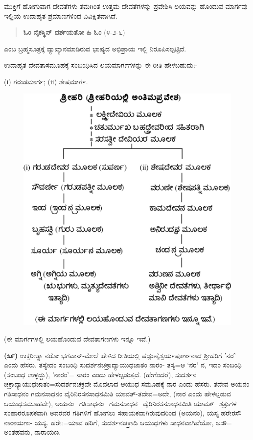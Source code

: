 ಮುಕ್ತಿಗೆ ಹೋಗುವಾಗ ದೇವತೆಗಳು ತಮಗಿಂತ ಉತ್ತಮ ದೇವತೆಗಳನ್ನು ಪ್ರವೇಶಿಸಿ ಲಯವನ್ನು ಹೊಂದುವ ಮಾರ್ಗವು ಇಲ್ಲಿಯ ಉದಾಹೃತ ಪ್ರಮಾಣಗಳಿಂದ ವಿವಿಕ್ಷಿತವಾಗಿದೆ.

\begin{verse}
\textbf{ಓಂ ನೈಕಸ್ಥಿನ್ ದರ್ಶಯತೋ ಹಿ ಓಂ} (೪-೨-೬)
\end{verse}

\noindent
ಎಂಬ ಬ್ರಹ್ಮಸೂತ್ರಕ್ಕೆ ವ್ಯಾಖ್ಯಾನಮಾಡಿರುವ ಭಾಷ್ಯದ ಅಭಿಪ್ರಾಯ ಇಲ್ಲಿ ನಿರೂಪಿಸಲ್ಪಟ್ಟಿದೆ.

ಉದಾಹೃತ ದೇವತಾಸಮೂಹಕ್ಕೆ ಸಂಬಂಧಿಸಿದ ಲಯಮಾರ್ಗಗಳನ್ನು ಈ ರೀತಿ ಹೇಳಬಹುದು:-

(i) ಗರುಡಮಾರ್ಗ; (ii) ಶೇಷಮಾರ್ಗ.

\begin{figure}[!htbp]
\includegraphics[scale=.85]{images/fig2.jpg}
\end{figure}

(ಈ ಮಾರ್ಗಗಳಲ್ಲಿ ಲಯಹೊಂದುವ ದೇವತಾಗಣಗಳು ಇನ್ನೂ ಇವೆ.)

\textbf{(೩೯)} ಉಕ್ತರೀತ್ಯಾ ನರೋ ಭಗವಾನ್-ಮೇಲೆ ಹೇಳಿದ ರೀತಿಯಲ್ಲಿ ಷಡ್ಗುಣೈಶ್ವರ್ಯಪೂರ್ಣನಾದ ಶ‍್ರೀಹರಿಗೆ 'ನರ' ಎಂದು ಹೆಸರು. ತಸ್ಯೇದಂ ಸಂಬಂಧಿ ಸುದರ್ಶನಚಕ್ರಾದ್ಯಾಯುಧಜಾತಂ ನಾರಂ- ತಸ್ಯ=ಆ `ನರ' ನ, ಇದಂ ಸಂಬಂಧಿ (ಸಂಬಂಧ ಉಳ್ಳದ್ದು), 'ನಾರಂ'= ನಾರಂ ಎಂದು ಹೇಳಲ್ಪಡುತ್ತದೆ. (ಹೇಗೆಂದರೆ), ಸುದರ್ಶನ ಚಕ್ರಾದ್ಯಾಯುಧ\-ಜಾತಂ=ಸುದರ್ಶನಚಕ್ರವೇ ಮೊದಲಾದ ಆಯುಧ ಸಮೂಹಕ್ಕೆ ನಾರ ಎಂದು ಹೆಸರು. ತದೇವ ಅಯನಂ ಗತಿಸಾಧನಂ ಗಮನಸಾಧನಂ ವೈರಿನಿರಸನಸಾಧನಮಿತಿ ಯಾವತ್-ತದೇವ=ಅದೇ, (ನಾರ ಎಂದು ಹೇಳಲ್ಪಡುವ ಆಯುಧಸಮೂಹವೇ), ಅಯನಂ=ಗತಿಸಾಧನಂ=ಗಮನ\-ಸಾಧನ=ವೈರಿನಿರಸನಸಾಧನಮಿತಿ ಯಾವತ್=ಶತ್ರುಗಳ ಸಂಹಾರರೂಪಕವಾಗಿ ಅವರವರ ಗತಿಗಳಿಗೆ ಹೋಗಲು ಸಹಾಯಕವಾಗಿರುವುದರಿಂದ (ಅಯನಂ), ಯಸ್ಯ ಹರೇರಸೌ‌ ನಾರಾಯಣಃ\-- ಯಸ್ಯ. ಹರೇಃ=ಯಾವ ಹರಿಗೆ, ಸುದರ್ಶನಚಕ್ರಾದಿ ಆಯುಧಗಳು ಸಾಧನವಾಗಿವೆಯೋ, ಅಸೌ= ಅಂತಹವನು, ನಾರಾಯಣ.

